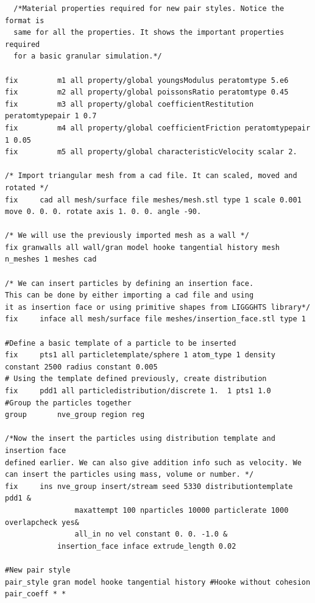 \documentclass{tufte-book} %
\begin{document}
\begin{verbatim}
  /*Material properties required for new pair styles. Notice the format is
  same for all the properties. It shows the important properties required
  for a basic granular simulation.*/

fix 		m1 all property/global youngsModulus peratomtype 5.e6
fix 		m2 all property/global poissonsRatio peratomtype 0.45
fix 		m3 all property/global coefficientRestitution peratomtypepair 1 0.7
fix 		m4 all property/global coefficientFriction peratomtypepair 1 0.05
fix 		m5 all property/global characteristicVelocity scalar 2.

/* Import triangular mesh from a cad file. It can scaled, moved and rotated */
fix		cad all mesh/surface file meshes/mesh.stl type 1 scale 0.001 move 0. 0. 0. rotate axis 1. 0. 0. angle -90.

/* We will use the previously imported mesh as a wall */
fix granwalls all wall/gran model hooke tangential history mesh n_meshes 1 meshes cad

/* We can insert particles by defining an insertion face.
This can be done by either importing a cad file and using
it as insertion face or using primitive shapes from LIGGGHTS library*/
fix		inface all mesh/surface file meshes/insertion_face.stl type 1

#Define a basic template of a particle to be inserted
fix		pts1 all particletemplate/sphere 1 atom_type 1 density constant 2500 radius constant 0.005
# Using the template defined previously, create distribution
fix		pdd1 all particledistribution/discrete 1.  1 pts1 1.0
#Group the particles together
group		nve_group region reg

/*Now the insert the particles using distribution template and insertion face
defined earlier. We can also give addition info such as velocity. We can insert the particles using mass, volume or number. */
fix		ins nve_group insert/stream seed 5330 distributiontemplate pdd1 &
                maxattempt 100 nparticles 10000 particlerate 1000 overlapcheck yes&
                all_in no vel constant 0. 0. -1.0 &
	        insertion_face inface extrude_length 0.02

#New pair style
pair_style gran model hooke tangential history #Hooke without cohesion
pair_coeff * *
\end{verbatim}
\vfill
\end{document}
